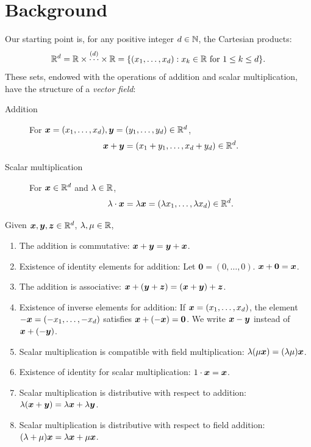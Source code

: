 

\chapter{Background}

Our starting point is, for any positive integer $d \in \mathbb{N}$, the Cartesian products:
\begin{equation*}
\mathbb{R}^d = \mathbb{R} \times \overset{(d)}{\dotsm} \times \mathbb{R} =\{ (x_1, \dotsc, x_d) : x_k \in \mathbb{R} \text{ for } 1\leq k \leq d\}.
\end{equation*}
These sets, endowed with the operations of addition and scalar multiplication, have the structure of a \emph{vector field}:
\begin{description}
	\item[Addition] For $\boldsymbol{x} = (x_1, \dotsc, x_d), \boldsymbol{y} = (y_1, \dotsc, y_d) \in \mathbb{R}^d$, 
	\begin{equation*}
	\boldsymbol{x} + \boldsymbol{y} = (x_1+y_1, \dotsc, x_d+y_d) \in \mathbb{R}^d.
	\end{equation*}
	\item[Scalar multiplication] For $\boldsymbol{x} \in \mathbb{R}^d$ and $\lambda \in \mathbb{R}$, 
	\begin{equation*}
	\lambda \cdot \boldsymbol{x} = \lambda \boldsymbol{x} = (\lambda x_1, \dotsc, \lambda x_d) \in \mathbb{R}^d.
	\end{equation*}
\end{description}
Given $\boldsymbol{x}, \boldsymbol{y}, \boldsymbol{z} \in \mathbb{R}^d$, $\lambda, \mu \in \mathbb{R}$,
\begin{enumerate}
	\item The addition is commutative: $\boldsymbol{x} + \boldsymbol{y} = \boldsymbol{y} + \boldsymbol{x}$.
	\item Existence of identity elements for addition: Let $\boldsymbol{0} = (0, \dotsc, 0)$. $\boldsymbol{x} + \boldsymbol{0} = \boldsymbol{x}$. 
	\item The addition is associative: $\boldsymbol{x} + (\boldsymbol{y} + \boldsymbol{z}) = (\boldsymbol{x} + \boldsymbol{y}) + \boldsymbol{z}$.
	\item Existence of inverse elements for addition: If $\boldsymbol{x} = (x_1, \dotsc, x_d)$, the element $-\boldsymbol{x} = (-x_1, \dotsc, -x_d)$ satisfies $\boldsymbol{x} + (-\boldsymbol{x}) = \boldsymbol{0}$.  We write $\boldsymbol{x} - \boldsymbol{y}$ instead of $\boldsymbol{x} + (-\boldsymbol{y})$.
	\item Scalar multiplication is compatible with field multiplication: $\lambda (\mu \boldsymbol{x}) = (\lambda \mu) \boldsymbol{x}$.
	\item Existence of identity for scalar multiplication: $1 \cdot \boldsymbol{x} = \boldsymbol{x}$.
	\item Scalar multiplication is distributive with respect to addition: $\lambda (\boldsymbol{x} + \boldsymbol{y}) = \lambda \boldsymbol{x} + \lambda \boldsymbol{y}$.
	\item Scalar multiplication is distributive with respect to field addition: $(\lambda + \mu)\boldsymbol{x} = \lambda \boldsymbol{x} + \mu\boldsymbol{x}$.
\end{enumerate}
